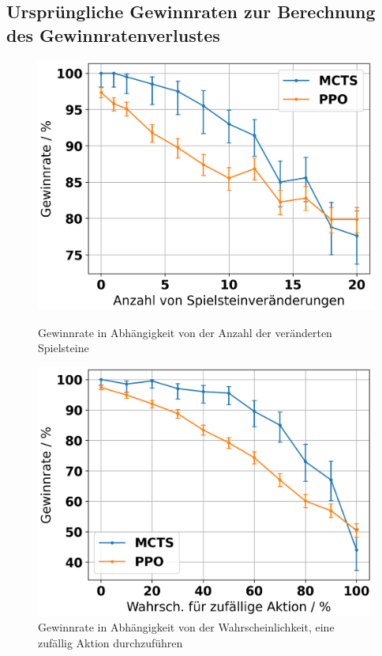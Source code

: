 \subsection{Ursprüngliche Gewinnraten zur Berechnung des Gewinnratenverlustes}

\begin{figure}[H]
	\begin{minipage}[c]{0.48\linewidth}
		\includegraphics[width=\linewidth]{Bilder/robustness-results/uncertain_observations_win_rates.png}
		\caption{Gewinnrate in Abhängigkeit von der Anzahl der veränderten Spielsteine}
	\end{minipage}
	\hfill
	\begin{minipage}[c]{0.48\linewidth}
		\includegraphics[width=\linewidth]{Bilder/robustness-results/uncertain_actions_win_rates.png}
		\caption{Gewinnrate in Abhängigkeit von der Wahrscheinlichkeit, eine zufällig Aktion durchzuführen}
	\end{minipage}
\end{figure}
